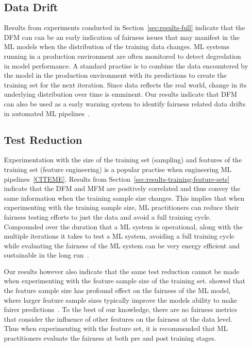 \documentclass{article}
\begin{document}


\subsection{Data Drift}\label{sec:discuss-data-drift}

Results from experiments conducted in Section \ref{sec:results-full}
indicate that the DFM can can be an early indication of fairness
issues that may manifest in the ML models when the distribution of the
training data changes. ML systems running in a production environment
are often monitored to detect degredation in model performance. A
standard practise is to combine the data encountered by the model in
the production environment with its predictions to create the training
set for the next iteration. Since data reflects the real world, change
in its underlying distribution over time is emminent. Our results
indicate that DFM can also be used as a early warning system to
identify fairness related data drifts in automated ML
pipelines \cite{CITEME}.

\subsection{Test Reduction}\label{sec:discuss-test-red}

Experimentation with the size of the training set (sampling) and
features of the training set (feature engineering) is a popular
practise when engineering ML pipelines \ref{CITEME}. Results from
Section \ref{sec:results-training-feature-sets} indicate that the DFM
and MFM are positively correlated and thus convey the same information
when the training sample size changes. This implies that when
experimenting with the training sample size, ML practitioners can
reduce their fairness testing efforts to just the data and avoid a
full training cycle. Compounded over the duration that a ML system is
operational, along with the multiple iterations it takes to test a ML
system, avoiding a full training cycle while evaluating the fairness
of the ML system can be very energy efficient and sustainable in the
long run \cite{CITME}.


Our results however also indicate that the same test reduction cannot
be made when experimenting with the feature sample size of the
training set. \citeauthor{zhang2021ignorance} showed that the feature
sample size has profound effect on the fairness of the ML model, where
larger feature sample sizes typically improve the models ability to
make fairer predictions \cite{zhang2021ignorance}. To the best of our
knowledge, there are no fairness metrics that consider the influence
of other features on the fairness at the data level. Thus when
experimenting with the feature set, it is recommended that ML
practitioners evaluate the fairness at both pre and post training
stages.
\end{document}
